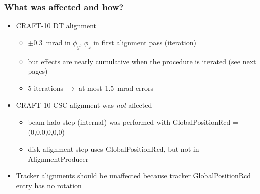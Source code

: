 \documentclass[compress]{beamer}
\begin{document}
\begin{frame}
\frametitle{What was affected and how?}
\begin{itemize}\setlength{\itemsep}{0.2 cm}
\item CRAFT-10 DT alignment
\begin{itemize}
\item $\pm$0.3~mrad in $\phi_y$, $\phi_z$ in first alignment pass (iteration)

\item but effects are nearly cumulative when the procedure is iterated (see next pages)

\item 5 iterations $\to$ at most 1.5~mrad errors
\end{itemize}

\item CRAFT-10 CSC alignment was {\it not} affected
\begin{itemize}
\item beam-halo step (internal) was performed with GlobalPositionRcd = (0,0,0,0,0,0)
\item disk alignment step uses GlobalPositionRcd, but not in AlignmentProducer
\end{itemize}

\item Tracker alignments should be unaffected because tracker
  GlobalPositionRcd entry has no rotation
\end{itemize}
\end{frame}
\end{document}
